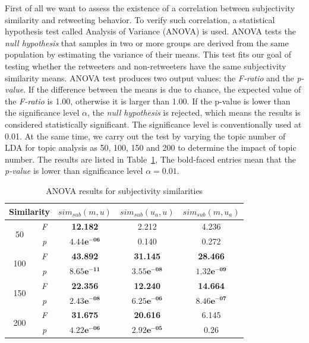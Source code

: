 \documentclass[letterpaper]{article}
\begin{document}
First of all we want to assess the existence of a correlation between subjectivity similarity and retweeting behavior. 
To verify such correlation, a statistical hypothesis test called Analysis of Variance (ANOVA) \cite{fisher1970statistical} is used. 
ANOVA tests the \textit{null hypothesis} that samples in two or more groups are derived from the same population by estimating the variance of their means. 
This test fits our goal of testing whether the retweeters and non-retweeters have the same subjectivity similarity means. 
ANOVA test produces two output values: the \textit{F-ratio} and the \textit{p-value}. 
If the difference between the means is due to chance, the expected value of the \textit{F-ratio} is 1.00, otherwise it is larger than 1.00. 
If the p-value is lower than the significance level $ \alpha $, the \textit{null hypothesis} is rejected, which means the results is considered statistically significant. 
The significance level is conventionally used at 0.01.
At the same time, we carry out the test by varying the topic number of LDA for topic analysis as 50, 100, 150 and 200 to determine the impact of topic number. 
The results are listed in Table~\ref{tab2}, The bold-faced entries mean that the \textit{p-value} is lower than significance level $ \alpha = 0.01 $.
\begin{table}[htb]
\scriptsize
\centering
\caption{ANOVA results for subjectivity similarities}
\label{tab2}
\begin{tabular}{|c|c|c|c|c|}
\hline
\multicolumn{2}{|c|}{Similarity}& $ sim_{sub} \left( m,u \right) $ & $ sim_{sub}\left( u_{a},u \right)  $ & $ sim_{sub}\left( m,u_{a} \right)  $\\
\hline
\multirow{2}{*}{50} & \textit{F} & \textbf{12.182} & 2.212 & 4.236 \\
\cline{2-5}
  & \textit{p} &  $\mathbf{4.44e^{-06}}$  & 0.140 & 0.272\\
\hline
\multirow{2}{*}{100} & \textit{F} & \textbf{43.892} & \textbf{31.145} & \textbf{28.466} \\
\cline{2-5}
  & \textit{p} &  $\mathbf{8.65e^{-11}}$  & $\mathbf{3.55e^{-08}}$ & $\mathbf{1.32e^{-09}}$\\
\hline
\multirow{2}{*}{150} & \textit{F} & \textbf{22.356} & \textbf{12.240} & \textbf{14.664} \\
\cline{2-5}
  & \textit{p} &  $\mathbf{2.43e^{-08}}$  & $\mathbf{6.25e^{-06}}$ & $\mathbf{8.46e^{-07}}$\\
\hline
\multirow{2}{*}{200} & \textit{F} & \textbf{31.675} & \textbf{20.616} & 6.145\\
\cline{2-5}
  & \textit{p} &  $\mathbf{4.22e^{-06}}$  & $\mathbf{2.92e^{-05}}$ & 0.26\\
\hline
\end{tabular}
\end{table}
\end{document}

